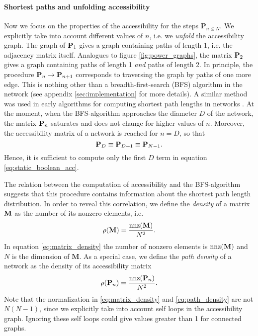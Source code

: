 \paragraph{Shortest paths and unfolding accessibility\color{Cayenne}{.}}
Now we focus on the properties of the accessibility for the steps $\mathbf{P}_{n\leq N}$.
We explicitly take into account different values of $n$, i.e. we \emph{unfold} the accessibility graph.
The graph of $\mathbf{P}_1$ gives a graph containing paths of length 1, i.e. the adjacency matrix itself.
Analogues to figure \ref{fig:power_graphs}, the matrix $\mathbf{P}_2$ gives a graph containing paths of length 1 \emph{and} paths of length 2.
In principle, the procedure $\mathbf{P}_n \rightarrow \mathbf{P}_{n+1}$ corresponds to traversing the graph by paths of one more edge.
This is nothing other than a breadth-first-search (BFS) algorithm in the network (see appendix \ref{sec:implementation} for more details).
A similar method was used in early algorithms for computing shortest path lengths in networks \citep{Floyd:1962vo,Warshall:1962wr}.
At the moment, when the BFS-algorithm approaches the diameter $D$ of the network, the matrix $\mathbf{P}_n$ saturates and does not change for higher values of $n$.
Moreover, the accessibility matrix of a network is reached for $n=D$, so that
\begin{equation}\label{eq:diameter_sat}
\mathbf{P}_{D}\equiv \mathbf{P}_{D+1}\equiv \mathbf{P}_{N-1}.
\end{equation}
Hence, it is sufficient to compute only the first $D$ term in equation \eqref{eq:static_boolean_acc}.

The relation between the computation of accessibility and the BFS-algorithm suggests that this procedure contains information about the shortest path length distribution.
In order to reveal this correlation, we define the \emph{density} of a matrix $\mathbf{M}$ as the number of its nonzero elements, i.e.
\begin{equation}\label{eq:matrix_density}
\rho (\mathbf{M}) =\frac{\mathrm{nnz}(\mathbf{M})}{N^2}.
\end{equation}
In equation \eqref{eq:matrix_density} the number of nonzero elements is $\mathrm{nnz}(\mathbf{M})$ and $N$ is the dimension of $\mathbf{M}$.
As a special case, we define the \emph{path density} of a  network as the density of its accessibility matrix
\begin{equation}\label{eq:path_density}
\rho (\mathbf{P}_n) =\frac{\mathrm{nnz}(\mathbf{P}_n)}{N^2}.
\end{equation}
Note that the normalization in \eqref{eq:matrix_density} and \eqref{eq:path_density} are not $N(N-1)$, since we explicitly take into account self loops in the accessibility graph.
Ignoring these self loops could give values greater than 1 for connected graphs.

